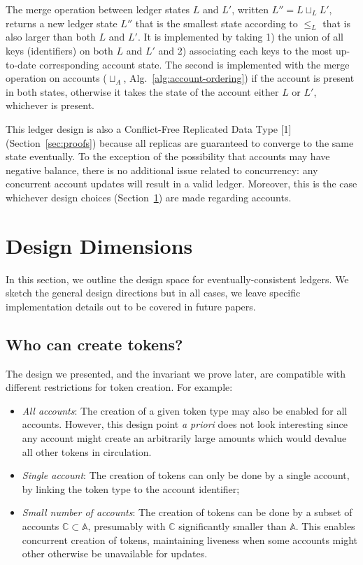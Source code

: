 \documentclass[9pt, oneside]{article}   	%
\begin{document}
The merge operation between ledger states $L$ and $L'$, written $L'' = L \sqcup_L L'$, returns a new ledger state $L''$ that is the smallest state according to $\leq_L$ that is also larger than both $L$ and $L'$. It is implemented by taking 1) the union of all keys (identifiers) on both $L$ and $L'$ and 2) associating each keys to the most up-to-date corresponding account state. The second is implemented with the merge operation on accounts ($\sqcup_A$, Alg.~\ref{alg:account-ordering}) if the account is present in both states, otherwise it takes the state of the account either $L$ or $L'$, whichever is present.


This ledger design is also a Conflict-Free Replicated Data Type [1] (Section~\ref{sec:proofs}) because all replicas are guaranteed to converge to the same state eventually. To the exception of the possibility that accounts may have negative balance, there is no additional issue related to concurrency: any concurrent account updates will result in a valid ledger. Moreover, this is the case whichever design choices (Section~\ref{sec:design-issues}) are made regarding accounts.


\section{Design Dimensions}
\label{sec:design-issues}

In this section, we outline the design space for eventually-consistent ledgers. We sketch the general design directions but in all cases, we leave specific implementation details out to be covered in future papers.

\subsection{Who can create tokens?}

The design we presented, and the invariant we prove later, are compatible with different restrictions for token creation. For example:
\begin{itemize}
	\item \textit{All accounts}: The creation of a given token type may also be enabled for all accounts. However, this design point \textit{a priori} does not look interesting since any account might create an arbitrarily large amounts which would devalue all other tokens in circulation.
	\item \textit{Single account}: The creation of tokens can only be done by a single account, by linking the token type to the account identifier;
	\item \textit{Small number of accounts}: The creation of tokens can be done by a subset of accounts $\mathds{C} \subset \mathds{A}$, presumably with $\mathds{C}$ significantly smaller than $\mathds{A}$. This enables concurrent creation of tokens, maintaining liveness when some accounts might other otherwise be unavailable for updates.
\end{itemize}
\end{document}

